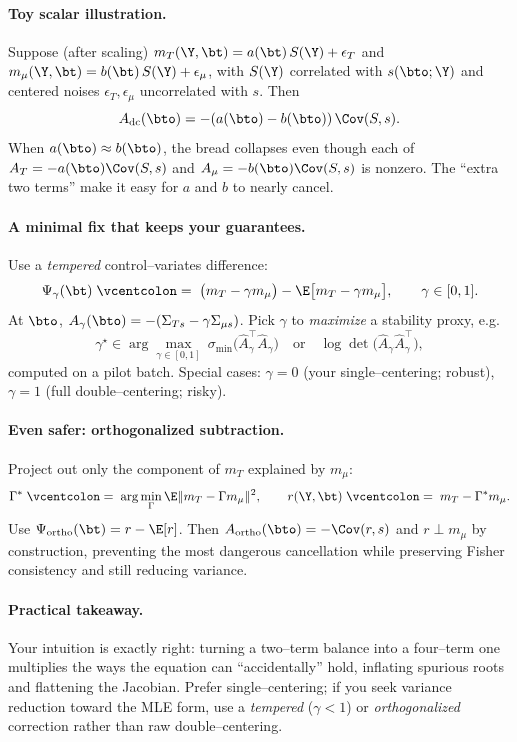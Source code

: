 \paragraph{Toy scalar illustration.}
Suppose (after scaling) 
$m_T(\Y,\bt)=a(\bt)\,S(\Y)+\epsilon_T$ and $m_\mu(\Y,\bt)=b(\bt)\,S(\Y)+\epsilon_\mu$, 
with $S(\Y)$ correlated with $s(\bto;\Y)$ and centered noises $\epsilon_T,\epsilon_\mu$ uncorrelated with $s$.
Then
\[
A_{\mathrm{dc}}(\bto)=-(a(\bto)-b(\bto))\,\Cov(S,s).
\]
When $a(\bto)\approx b(\bto)$, the bread collapses even though each of $A_T= -a(\bto)\Cov(S,s)$ and $A_\mu=-b(\bto)\Cov(S,s)$ is nonzero. The “extra two terms” make it easy for $a$ and $b$ to nearly cancel.

\paragraph{A minimal fix that keeps your guarantees.}
Use a \emph{tempered} control–variates difference:
\[
\Psi_\gamma(\bt)\;\vcentcolon=\;\big(m_T-\gamma m_\mu\big)-\E\big[m_T-\gamma m_\mu\big],
\qquad \gamma\in[0,1].
\]
At $\bto$, $A_\gamma(\bto)=-(\Sigma_{Ts}-\gamma\Sigma_{\mu s})$.
Pick $\gamma$ to \emph{maximize} a stability proxy, e.g.
\[
\gamma^\star\in\arg\max_{\gamma\in[0,1]} \ \sigma_{\min}\!\big(\widehat A_\gamma^\top \widehat A_\gamma\big)
\quad\text{or}\quad
\log\det\!\big(\widehat A_\gamma \widehat A_\gamma^\top\big),
\]
computed on a pilot batch. 
Special cases: $\gamma=0$ (your single–centering; robust), $\gamma=1$ (full double–centering; risky).

\paragraph{Even safer: orthogonalized subtraction.}
Project out only the component of $m_T$ explained by $m_\mu$:
\[
\Gamma^\ast \;\vcentcolon=\;\arg\min_\Gamma \E\|m_T-\Gamma m_\mu\|^2,\qquad
r(\Y,\bt)\;\vcentcolon=\;m_T-\Gamma^\ast m_\mu.
\]
Use $\Psi_{\mathrm{ortho}}(\bt)=r-\E[r]$.
Then $A_{\mathrm{ortho}}(\bto)=-\Cov(r,s)$ and $r\perp m_\mu$ by construction, preventing the most dangerous cancellation while preserving Fisher consistency and still reducing variance.

\paragraph{Practical takeaway.}
Your intuition is exactly right: turning a two–term balance into a four–term one multiplies the ways the equation can “accidentally” hold, inflating spurious roots and flattening the Jacobian. 
Prefer single–centering; if you seek variance reduction toward the MLE form, use a \emph{tempered} ($\gamma<1$) or \emph{orthogonalized} correction rather than raw double–centering.
